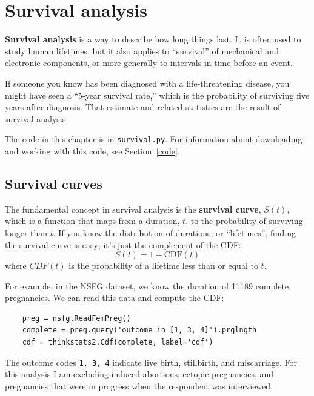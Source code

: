 \documentclass[12pt]{book}
\newcommand{\CDF}{\mathrm{CDF}}
\theoremstyle{exercise}
\begin{document}
\chapter{Survival analysis}

{\bf Survival analysis} is a way to describe how long things last.
It is often used to study human lifetimes, but it
also applies to ``survival'' of mechanical and electronic components, or
more generally to intervals in time before an event.%
%
%

If someone you know has been diagnosed with a life-threatening
disease, you might have seen a ``5-year survival rate,'' which
is the probability of surviving five years after diagnosis.  That
estimate and related statistics are the result of survival analysis.%

The code in this chapter is in {\tt survival.py}.  For information
about downloading and working with this code, see Section~\ref{code}.


\section{Survival curves}%
\label{survival}

The fundamental concept in survival analysis is the {\bf survival
  curve}, $S(t)$, which is a function that maps from a duration, $t$, to the
probability of surviving longer than $t$.  If you know the distribution
of durations, or ``lifetimes'', finding the survival curve is easy;
it's just the complement of the CDF:%
%
\[ S(t) = 1 - \CDF(t) \]
%
where $CDF(t)$ is the probability of a lifetime less than or equal
to $t$.%
%
%

For example, in the NSFG dataset, we know the duration of 11189
complete pregnancies.  We can read this data and compute the CDF:%

\begin{verbatim}
    preg = nsfg.ReadFemPreg()
    complete = preg.query('outcome in [1, 3, 4]').prglngth
    cdf = thinkstats2.Cdf(complete, label='cdf')
\end{verbatim}

The outcome codes {\tt 1, 3, 4} indicate live birth, stillbirth,
and miscarriage.  For this analysis I am excluding induced abortions,
ectopic pregnancies, and pregnancies that were in progress when
the respondent was interviewed.
\end{document}
